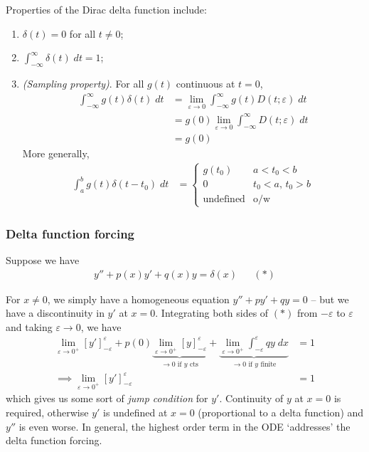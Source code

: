 \documentclass{../template/note}
\begin{document}
    Properties of the Dirac delta function include:
    \begin{enumerate}[label=\protect\circled{\arabic*}]
        \item \(\delta(t) = 0\) for all \(t \neq 0\);
        \item \(\int_{-\infty}^\infty \delta(t) \; dt = 1\);
        \item \emph{(Sampling property)}. For all \(g(t)\) continuous at \(t = 0\),
        \begin{align*}
            \int_{-\infty}^\infty g(t) \delta(t) \; dt &= \lim_{\varepsilon \to 0} \int_{-\infty}^\infty g(t) D(t; \varepsilon) \; dt \\
            &= g(0) \lim_{\varepsilon \to 0} \int_{-\infty}^\infty D(t; \varepsilon) \; dt \\
            &= g(0)
        \end{align*}
        More generally,
        \begin{align*}
            \int_a^b g(t) \delta(t - t_0) \; dt &= \begin{cases}
                g(t_0) & a < t_0 < b \\
                0 & t_0 < a,\, t_0 > b \\
                \text{undefined} & \text{o/w}
            \end{cases}
        \end{align*}
    \end{enumerate}
    
    \subsubsection{Delta function forcing}

    Suppose we have
    \begin{align*}
        y'' + p(x) y' + q(x) y = \delta(x) && (*)
    \end{align*}
    
    For \(x \neq 0\), we simply have a homogeneous equation \(y'' + py' + qy = 0\) -- but we have a discontinuity in \(y'\) at \(x = 0\). Integrating both sides of \((*)\) from \(-\varepsilon\) to \(\varepsilon\) and taking \(\varepsilon \to 0\), we have
    \begin{align*}
        \lim_{\varepsilon \to 0^+} [y']_{-\varepsilon}^{\varepsilon} + p(0) \underbrace{\lim_{\varepsilon \to 0^+} [y]_{-\varepsilon}^{\varepsilon}}_{\to 0 \text{ if } y \text{ cts}} + \underbrace{\lim_{\varepsilon \to 0^+} \int_{-\varepsilon}^{\varepsilon} qy \; dx}_{\to 0 \text{ if } y \text{ finite}} &= 1 \\
        \implies \lim_{\varepsilon \to 0^+} [y']_{-\varepsilon}^{\varepsilon} &= 1
    \end{align*}
    which gives us some sort of \emph{jump condition} for \(y'\). Continuity of \(y\) at \(x=0\) is required, otherwise \(y'\) is undefined at \(x=0\) (proportional to a delta function) and \(y''\) is even worse. In general, the highest order term in the ODE `addresses' the delta function forcing.
    
\end{document}
